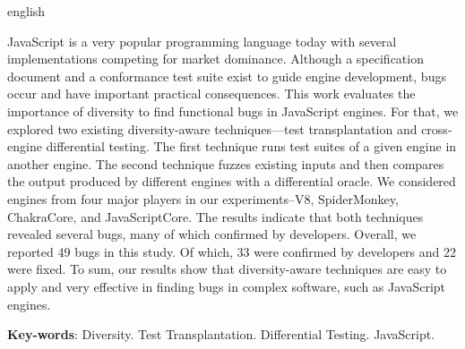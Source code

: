 
\begin{resumo}[Abstract]
 \begin{otherlanguage*}{english}

\noindent
JavaScript is a very popular programming language today with several
implementations competing for market dominance. Although a specification
document and a conformance test suite exist to guide engine development,
bugs occur and have important practical consequences.
This work evaluates the importance of diversity to find functional bugs in
JavaScript engines. For that, we explored two existing diversity-aware
techniques—test transplantation and cross-engine differential testing.
The first technique runs test suites of a given engine in another engine.
The second technique fuzzes existing inputs and then compares the output
produced by different engines with a differential oracle. We considered
engines from four major players in our experiments–V8, SpiderMonkey,
ChakraCore, and JavaScriptCore. The results indicate that both techniques
revealed several bugs, many of which confirmed by developers. Overall,
we reported 49 bugs in this study. Of which, 33 were confirmed by
developers and 22 were fixed. To sum, our results show that diversity-aware
techniques are easy to apply and very effective in finding bugs in
complex software, such as JavaScript engines.

	\vspace{\onelineskip}
	\noindent 
	\textbf{Key-words}: Diversity. Test Transplantation. Differential Testing. JavaScript.
	\end{otherlanguage*}
\end{resumo}

